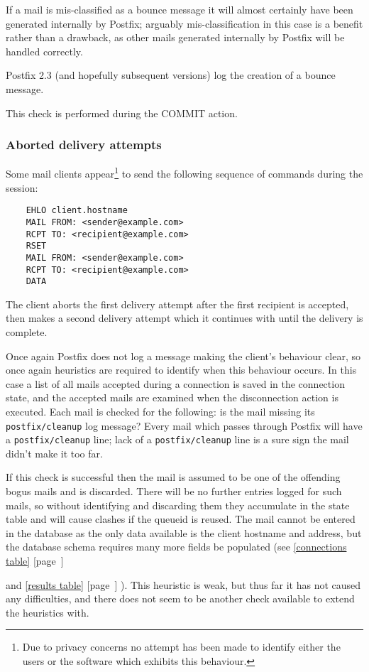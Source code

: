 \documentclass[a4paper,12pt,draft]{article}
\newcommand{\refwithpage}[1]{%
    \empty{}\ref{#1} [page~\pageref{#1}]%
}
\newcommand{\sectionref}[1]{%
    \textsection{}\refwithpage{#1}%
}
\newcommand{\daemon}[1]{%
    \texttt{postfix/#1}%
}
\begin{document}
If a mail is mis-classified as a bounce message it will almost certainly
have been generated internally by Postfix; arguably mis-classification in
this case is a benefit rather than a drawback, as other mails generated
internally by Postfix will be handled correctly.

Postfix 2.3 (and hopefully subsequent versions) log the creation of a
bounce message.

This check is performed during the COMMIT action.

\subsubsection{Aborted delivery attempts}

\label{aborted-delivery-attempts}

Some mail clients appear\footnote{Due to privacy concerns no attempt has
been made to identify either the users or the software which exhibits this
behaviour.} to send the following sequence of commands during
the \SMTP{} session:

\begin{verbatim}
    EHLO client.hostname
    MAIL FROM: <sender@example.com>
    RCPT TO: <recipient@example.com>
    RSET
    MAIL FROM: <sender@example.com>
    RCPT TO: <recipient@example.com>
    DATA
\end{verbatim}

The client aborts the first delivery attempt after the first recipient is
accepted, then makes a second delivery attempt which it continues with
until the delivery is complete.

Once again Postfix does not log a message making the client's behaviour
clear, so once again heuristics are required to identify when this
behaviour occurs.  In this case a list of all mails accepted during a
connection is saved in the connection state, and the accepted mails are
examined when the disconnection action is executed.  Each mail is checked
for the following: is the mail missing its \daemon{cleanup} log message?
Every mail which passes through Postfix will have a \daemon{cleanup} line;
lack of a \daemon{cleanup} line is a sure sign the mail didn't make it too
far.

If this check is successful then the mail is assumed to be one of the
offending bogus mails and is discarded.  There will be no further entries
logged for such mails, so without identifying and discarding them they
accumulate in the state table and will cause clashes if the queueid is
reused.  The mail cannot be entered in the database as the only data
available is the client hostname and \IP{} address, but the database schema
requires many more fields be populated (see \sectionref{connections table}
and \sectionref{results table}).  This heuristic is weak, but thus far it
has not caused any difficulties, and there does not seem to be another
check available to extend the heuristics with.
\end{document}
